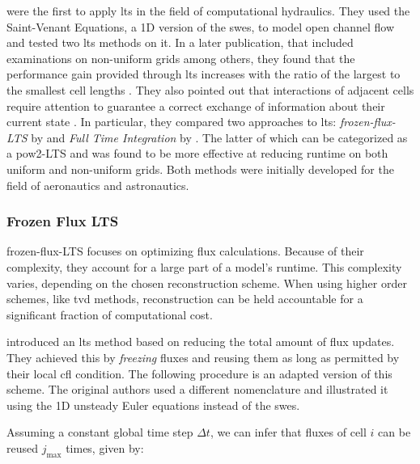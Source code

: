 \textcite{crossley1999} were the first to apply \gls{lts} in the field of computational hydraulics. They used the Saint-Venant Equations, a \gls{1D} version of the \glspl{swe}, to model open channel flow and tested two \gls{lts} methods on it.
In a later publication, that included examinations on non-uniform grids among others, they found that the performance gain provided through \gls{lts} increases with the ratio of the largest to the smallest cell lengths \autocite{crossley2003}.
They also pointed out that interactions of adjacent cells require attention to guarantee a correct exchange of information about their current state \autocite{crossley2003}.
In particular, they compared two approaches to \gls{lts}: \emph{\gls{frozen-flux-LTS}} by \textcite{zhang1994a} and \emph{Full Time Integration} by \textcite{kleb1992}.
The latter of which can be categorized as a \gls{pow2-LTS} and was found to be more effective at reducing runtime on both uniform and non-uniform grids.
Both methods were initially developed for the field of aeronautics and astronautics.

\subsubsection{Frozen Flux LTS}
\Acrfull{frozen-flux-LTS} focuses on optimizing flux calculations. Because of their complexity, they account for a large part of a model's runtime.
\label{fix:tvd-fo-cost}This complexity varies, depending on the chosen reconstruction scheme. 
When using higher order schemes, like \gls{tvd} methods, reconstruction can be held accountable for a significant fraction of computational cost.

\textcite{zhang1994a} introduced an \gls{lts} method based on reducing the total amount of flux updates.
They achieved this by \emph{freezing} fluxes and reusing them as long as permitted by their local \gls{cfl} condition.
The following procedure is an adapted version of this scheme. The original authors used a different nomenclature and illustrated it using the \gls{1D} unsteady Euler equations instead of the \glspl{swe}.

Assuming a constant global time step $\Delta t$, we can infer that fluxes of cell $i$ can be reused $j_{\max}$ times, given by:

